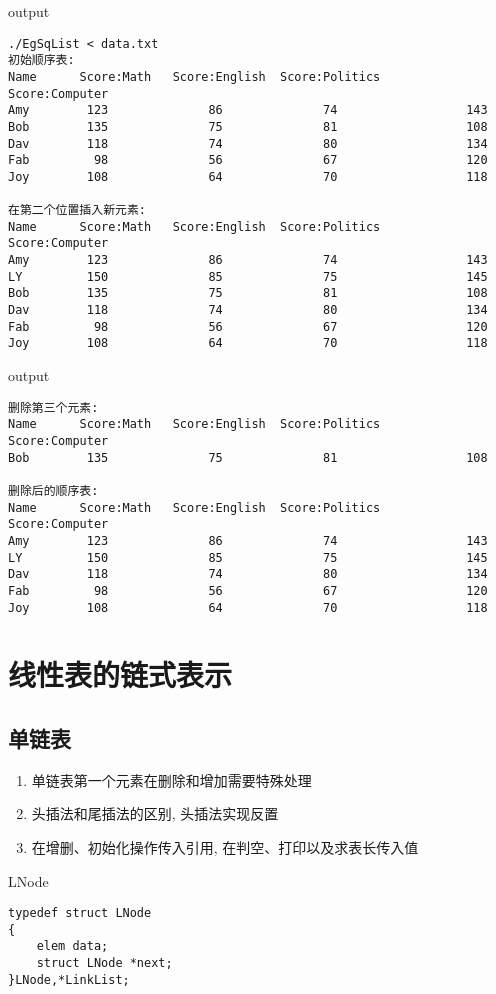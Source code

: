 \begin{macbox}{output}
    \begin{verbatim}
./EgSqList < data.txt
初始顺序表:
Name      Score:Math   Score:English  Score:Politics       Score:Computer
Amy        123              86              74                  143
Bob        135              75              81                  108
Dav        118              74              80                  134
Fab         98              56              67                  120
Joy        108              64              70                  118

在第二个位置插入新元素:
Name      Score:Math   Score:English  Score:Politics       Score:Computer
Amy        123              86              74                  143
LY         150              85              75                  145
Bob        135              75              81                  108
Dav        118              74              80                  134
Fab         98              56              67                  120
Joy        108              64              70                  118
    \end{verbatim}
\end{macbox}
\begin{macbox}{output}
    \begin{verbatim}
删除第三个元素:
Name      Score:Math   Score:English  Score:Politics       Score:Computer
Bob        135              75              81                  108

删除后的顺序表:
Name      Score:Math   Score:English  Score:Politics       Score:Computer
Amy        123              86              74                  143
LY         150              85              75                  145
Dav        118              74              80                  134
Fab         98              56              67                  120
Joy        108              64              70                  118
    \end{verbatim}
\end{macbox}
\section{线性表的链式表示}
\subsection{单链表}
\begin{definition}[单链表]
    \begin{enumerate}
        \item 单链表第一个元素在删除和增加需要特殊处理
        \item 头插法和尾插法的区别, 头插法实现反置
        \item 在增删、初始化操作传入引用, 在判空、打印以及求表长传入值
    \end{enumerate}
\end{definition}
\begin{macbox}{LNode}
	\begin{verbatim}
typedef struct LNode
{
    elem data;
    struct LNode *next;
}LNode,*LinkList;
    \end{verbatim}
\end{macbox}

